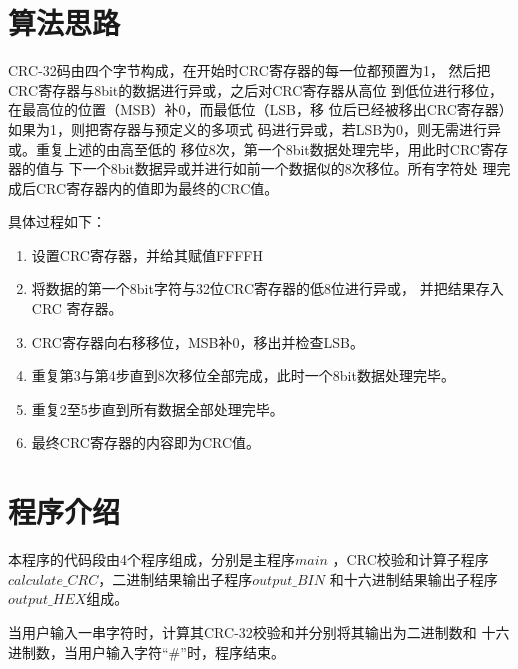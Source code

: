 \documentclass[UTF-8, a4paper, 12pt]{ctexart}
\begin{document}
\section{算法思路}


CRC-32码由四个字节构成，在开始时CRC寄存器的每一位都预置为1，
然后把CRC寄存器与8bit的数据进行异或，之后对CRC寄存器从高位
到低位进行移位，在最高位的位置（MSB）补0，而最低位（LSB，移
位后已经被移出CRC寄存器）如果为1，则把寄存器与预定义的多项式
码进行异或，若LSB为0，则无需进行异或。重复上述的由高至低的
移位8次，第一个8bit数据处理完毕，用此时CRC寄存器的值与
下一个8bit数据异或并进行如前一个数据似的8次移位。所有字符处
理完成后CRC寄存器内的值即为最终的CRC值。

具体过程如下：
\begin{enumerate}
    \item 设置CRC寄存器，并给其赋值FFFFH
    \item 将数据的第一个8bit字符与32位CRC寄存器的低8位进行异或，
    并把结果存入 CRC 寄存器。
    \item CRC寄存器向右移移位，MSB补0，移出并检查LSB。
    \item 重复第3与第4步直到8次移位全部完成，此时一个8bit数据处理完毕。
    \item 重复2至5步直到所有数据全部处理完毕。
    \item 最终CRC寄存器的内容即为CRC值。
\end{enumerate}


\section{程序介绍}

本程序的代码段由4个程序组成，分别是主程序$main$
，CRC校验和计算子程序$calculate\_CRC$，二进制结果输出子程序$output\_BIN$
和十六进制结果输出子程序$output\_HEX$组成。

当用户输入一串字符时，计算其CRC-32校验和并分别将其输出为二进制数和
十六进制数，当用户输入字符“$\#$”时，程序结束。
\end{document}
